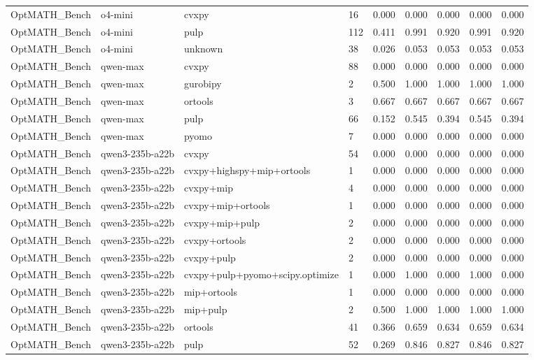 \begin{table}[t]
\begin{tabular}{lllllllll}
OptMATH\_Bench & o4-mini & cvxpy & 16 & 0.000 & 0.000 & 0.000 & 0.000 & 0.000 \\
OptMATH\_Bench & o4-mini & pulp & 112 & 0.411 & 0.991 & 0.920 & 0.991 & 0.920 \\
OptMATH\_Bench & o4-mini & unknown & 38 & 0.026 & 0.053 & 0.053 & 0.053 & 0.053 \\
OptMATH\_Bench & qwen-max & cvxpy & 88 & 0.000 & 0.000 & 0.000 & 0.000 & 0.000 \\
OptMATH\_Bench & qwen-max & gurobipy & 2 & 0.500 & 1.000 & 1.000 & 1.000 & 1.000 \\
OptMATH\_Bench & qwen-max & ortools & 3 & 0.667 & 0.667 & 0.667 & 0.667 & 0.667 \\
OptMATH\_Bench & qwen-max & pulp & 66 & 0.152 & 0.545 & 0.394 & 0.545 & 0.394 \\
OptMATH\_Bench & qwen-max & pyomo & 7 & 0.000 & 0.000 & 0.000 & 0.000 & 0.000 \\
OptMATH\_Bench & qwen3-235b-a22b & cvxpy & 54 & 0.000 & 0.000 & 0.000 & 0.000 & 0.000 \\
OptMATH\_Bench & qwen3-235b-a22b & cvxpy+highspy+mip+ortools & 1 & 0.000 & 0.000 & 0.000 & 0.000 & 0.000 \\
OptMATH\_Bench & qwen3-235b-a22b & cvxpy+mip & 4 & 0.000 & 0.000 & 0.000 & 0.000 & 0.000 \\
OptMATH\_Bench & qwen3-235b-a22b & cvxpy+mip+ortools & 1 & 0.000 & 0.000 & 0.000 & 0.000 & 0.000 \\
OptMATH\_Bench & qwen3-235b-a22b & cvxpy+mip+pulp & 2 & 0.000 & 0.000 & 0.000 & 0.000 & 0.000 \\
OptMATH\_Bench & qwen3-235b-a22b & cvxpy+ortools & 2 & 0.000 & 0.000 & 0.000 & 0.000 & 0.000 \\
OptMATH\_Bench & qwen3-235b-a22b & cvxpy+pulp & 2 & 0.000 & 0.000 & 0.000 & 0.000 & 0.000 \\
OptMATH\_Bench & qwen3-235b-a22b & cvxpy+pulp+pyomo+scipy.optimize & 1 & 0.000 & 1.000 & 0.000 & 1.000 & 0.000 \\
OptMATH\_Bench & qwen3-235b-a22b & mip+ortools & 1 & 0.000 & 0.000 & 0.000 & 0.000 & 0.000 \\
OptMATH\_Bench & qwen3-235b-a22b & mip+pulp & 2 & 0.500 & 1.000 & 1.000 & 1.000 & 1.000 \\
OptMATH\_Bench & qwen3-235b-a22b & ortools & 41 & 0.366 & 0.659 & 0.634 & 0.659 & 0.634 \\
OptMATH\_Bench & qwen3-235b-a22b & pulp & 52 & 0.269 & 0.846 & 0.827 & 0.846 & 0.827 \\

\end{tabular}
\end{table}
